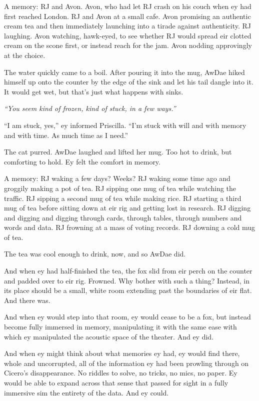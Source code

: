 A memory: RJ and Avon. Avon, who had let RJ crash on his couch when ey had first reached London. RJ and Avon at a small cafe. Avon promising an authentic cream tea and then immediately launching into a tirade against authenticity. RJ laughing. Avon watching, hawk-eyed, to see whether RJ would spread eir clotted cream on the scone first, or instead reach for the jam. Avon nodding approvingly at the choice.

The water quickly came to a boil. After pouring it into the mug, AwDae hiked himself up onto the counter by the edge of the sink and let his tail dangle into it. It would get wet, but that's just what happens with sinks.

\emph{``You seem kind of frozen, kind of stuck, in a few ways.''}

``I am stuck, yes,'' ey informed Priscilla. ``I'm stuck with will and with memory and with time. As much time as I need.''

The cat purred. AwDae laughed and lifted her mug. Too hot to drink, but comforting to hold. Ey felt the comfort in memory.

A memory: RJ waking a few days? Weeks? RJ waking some time ago and groggily making a pot of tea. RJ sipping one mug of tea while watching the traffic. RJ sipping a second mug of tea while making rice. RJ starting a third mug of tea before sitting down at eir rig and getting lost in research. RJ digging and digging and digging through cards, through tables, through numbers and words and data. RJ frowning at a mass of voting records. RJ downing a cold mug of tea.

The tea was cool enough to drink, now, and so AwDae did.

And when ey had half-finished the tea, the fox slid from eir perch on the counter and padded over to eir rig. Frowned. Why bother with such a thing? Instead, in its place should be a small, white room extending past the boundaries of eir flat. And there was.

And when ey would step into that room, ey would cease to be a fox, but instead become fully immersed in memory, manipulating it with the same ease with which ey manipulated the acoustic space of the theater. And ey did.

And when ey might think about what memories ey had, ey would find there, whole and uncorrupted, all of the information ey had been prowling through on Cicero's disappearance. No riddles to solve, no tricks, no mics, no paper. Ey would be able to expand across that sense that passed for sight in a fully immersive sim the entirety of the data. And ey could.

